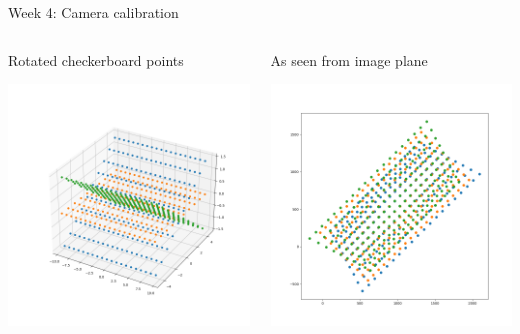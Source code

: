 \documentclass[aspectratio=169,hyperref={pdfpagelabels=false}]{beamer}
\begin{document}
\begin{frame}{ Week 4: Camera calibration }
\begin{columns}
	\begin{column}{.5\textwidth}
		\begin{block}{Rotated checkerboard points}
			\begin{center}
				\includegraphics[width=\textwidth]{exercise_imgs/ex4-4-1.png}
			\end{center}
		\end{block}					
	\end{column}	
	\begin{column}{.5\textwidth}
		\begin{block}{As seen from image plane}
		\begin{center}
			\includegraphics[width=\textwidth]{exercise_imgs/ex4-4-2.png}

\end{center}
\end{block}
\end{column}
\end{columns}
\end{frame}
\end{document}
